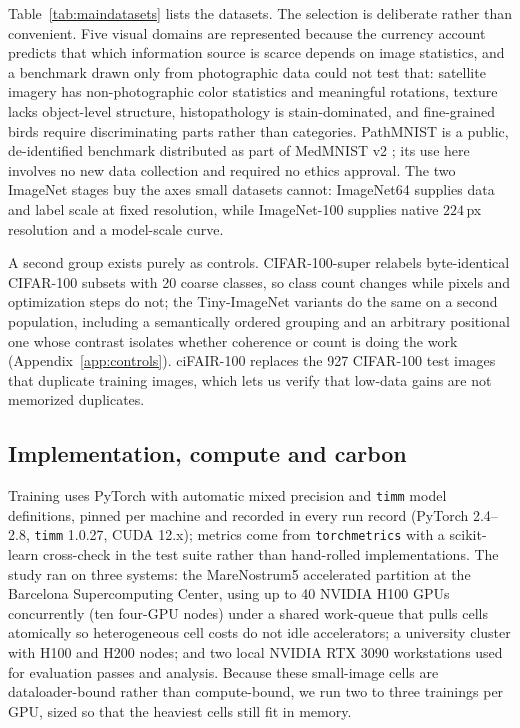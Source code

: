 Table~\ref{tab:maindatasets} lists the datasets. The selection is
deliberate rather than convenient. Five visual domains are represented
because the currency account predicts that which information source is
scarce depends on image statistics, and a benchmark drawn only from
photographic data could not test that: satellite imagery has
non-photographic color statistics and meaningful rotations, texture
lacks object-level structure, histopathology is stain-dominated, and
fine-grained birds require discriminating parts rather than categories.
PathMNIST is a public, de-identified benchmark distributed as part of
MedMNIST v2 \citep{yang2023medmnist}; its use here involves no new data
collection and required no ethics approval.
The two ImageNet stages buy the axes small datasets cannot: ImageNet64
supplies data and label scale at fixed resolution, while ImageNet-100
supplies native $224$\,px resolution and a model-scale curve.

A second group exists purely as controls. CIFAR-100-super relabels
byte-identical CIFAR-100 subsets with 20 coarse classes, so class count
changes while pixels and optimization steps do not; the Tiny-ImageNet
variants do the same on a second population, including a semantically
ordered grouping and an arbitrary positional one whose contrast isolates
whether coherence or count is doing the work
(Appendix~\ref{app:controls}). ciFAIR-100 replaces the 927 CIFAR-100 test
images that duplicate training images, which lets us verify that low-data
gains are not memorized duplicates.

\subsection{Implementation, compute and carbon}\label{sec:compute}
Training uses PyTorch with automatic mixed precision and \texttt{timm}
model definitions, pinned per machine and recorded in every run record
(PyTorch 2.4--2.8, \texttt{timm} 1.0.27, CUDA 12.x); metrics come from
\texttt{torchmetrics} with a scikit-learn cross-check in the test suite
rather than hand-rolled implementations. The study ran on three systems:
the MareNostrum5 accelerated partition at the Barcelona Supercomputing
Center, using up to 40 NVIDIA H100 GPUs concurrently (ten four-GPU nodes)
under a shared work-queue that pulls cells atomically so heterogeneous
cell costs do not idle accelerators; a university cluster with H100 and
H200 nodes; and two local NVIDIA RTX 3090 workstations used for evaluation
passes and analysis. Because these small-image cells are dataloader-bound
rather than compute-bound, we run two to three trainings per GPU, sized
so that the heaviest cells still fit in memory.


